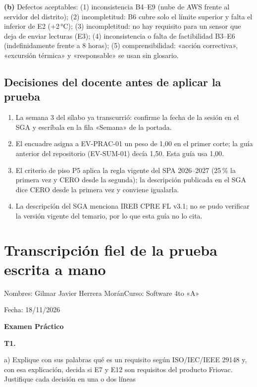 \documentclass[11pt]{article}
\newcommand{\seccion}[1]{\section{\textcolor{utegreendk}{#1}}}
\newcommand{\subseccion}[1]{\subsection{\textcolor{midblue}{#1}}}
\begin{document}
\textbf{(b)} Defectos aceptables: (1) inconsistencia B4--E9 (nube de AWS frente al servidor del distrito); (2) incompletitud: B6 cubre solo el límite superior y falta el inferior de E2 (+2\,°C); (3) incompletitud: no hay requisito para un sensor que deja de enviar lecturas (E3); (4) inconsistencia o falta de factibilidad B3--E6 (indefinidamente frente a 8 horas); (5) comprensibilidad: «acción correctiva», «excursión térmica» y «responsable» se usan sin glosario.

\subseccion{Decisiones del docente antes de aplicar la prueba}

\begin{enumerate}[leftmargin=18pt,itemsep=2pt]
	\item La semana 3 del sílabo ya transcurrió: confirme la fecha de la sesión en el SGA y escríbala en la fila «Semana» de la portada.
	\item El encuadre asigna a EV-PRAC-01 un peso de 1,00 en el primer corte; la guía anterior del repositorio (EV-SUM-01) decía 1,50. Esta guía usa 1,00.
	\item El criterio de piso P5 aplica la regla vigente del SPA 2026--2027 (25\,\% la primera vez y CERO desde la segunda); la descripción publicada en el SGA dice CERO desde la primera vez y conviene igualarla.
	\item La descripción del SGA menciona IREB CPRE FL v3.1; no se pudo verificar la versión vigente del temario, por lo que esta guía no lo cita.
\end{enumerate}

\fi


\clearpage
\seccion{Transcripción fiel de la prueba escrita a mano}

Nombres: Gilmar Javier Herrera Morán\hfill Curso: Software 4to «A»

Fecha: 18/11/2026

\begin{center}
\textbf{Examen Práctico}
\end{center}

\textbf{T1.}

a) Explique con sus palabras qué es un requisito según ISO/IEC/IEEE 29148 y, con esa explicación, decida si E7 y E12 son requisitos del producto Friovac. Justifique cada decisión en una o dos líneas
\end{document}
